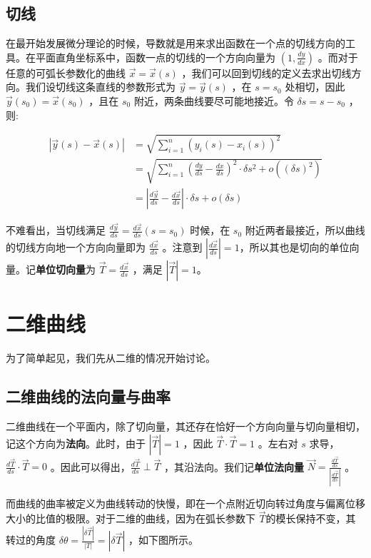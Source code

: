 \documentclass[fontset=windows]{article}
\begin{document}
\subsection{切线}

在最开始发展微分理论的时候，导数就是用来求出函数在一个点的切线方向的工具。在平面直角坐标系中，函数一点的切线的一个方向向量为 $(1,\frac{dy}{dx})$ 。而对于任意的可弧长参数化的曲线 $\vec{x} = \vec{x}(s) $ ，我们可以回到切线的定义去求出切线方向。我们设切线这条直线的参数形式为 $\vec{y} = \vec{y}(s)$ ，在 $ s = s_0 $ 处相切，因此 $\vec{y}(s_0) = \vec{x}(s_0)$ ，且在 $s_0$ 附近，两条曲线要尽可能地接近。令 $\delta{s} =s -s_0$ ，则:

$$
\begin{aligned}
|\vec{y}(s) - \vec{x}(s)| 
&= \sqrt{\sum_{i=1}^{n}{(y_i(s) - x_i(s)) ^ 2}} \\
&= \sqrt{\sum_{i=1}^{n}{(\frac{dy}{ds}-\frac{dx}{ds})^2 \cdot\delta{s}^2} + o({(δs)^2})} \\
&= |\frac{d\vec{y}}{ds} - \frac{d\vec{x}}{ds}| \cdot \delta{s} +o(\delta{s})
\end{aligned}
$$

不难看出，当切线满足 $\frac{d\vec{y}}{ds} = \frac{d\vec{x}}{ds} (s=s_0)$ 时候，在 $s_0$ 附近两者最接近，所以曲线的切线方向地一个方向向量即为 $\frac{d\vec{x}}{ds}$ 。注意到 $|\frac{d\vec{x}}{ds}| = 1$，所以其也是切向的单位向量。记\textbf{单位切向量}为 $\vec{T} = \frac{d\vec{x}}{ds}$ ，满足 $|\vec{T}| = 1$。

\section{二维曲线}

为了简单起见，我们先从二维的情况开始讨论。

\subsection{二维曲线的法向量与曲率}

二维曲线在一个平面内，除了切向量，其还存在恰好一个方向向量与切向量相切，记这个方向为\textbf{法向}。此时，由于 $|\vec{T}| = 1$ ，因此 $\vec{T} \cdot \vec{T} = 1$ 。左右对 $s$ 求导，$\frac{d\vec{T}}{ds} \cdot \vec{T} = 0$ 。因此可以得出，$\frac{d\vec{T}}{ds} \perp \vec{T}$ ，其沿法向。我们记\textbf{单位法向量} $\vec{N} = \frac{\frac{d\vec{T}}{ds}}{|\frac{d\vec{T}}{ds}|} $ 。

而曲线的曲率被定义为曲线转动的快慢，即在一个点附近切向转过角度与偏离位移大小的比值的极限。对于二维的曲线，因为在弧长参数下 $\vec{T}$的模长保持不变，其转过的角度 $\delta \theta = \frac{|\delta{\vec{T}}|}{|T|} = |\delta{\vec{T}}|  $ ，如下图所示。
\end{document}
